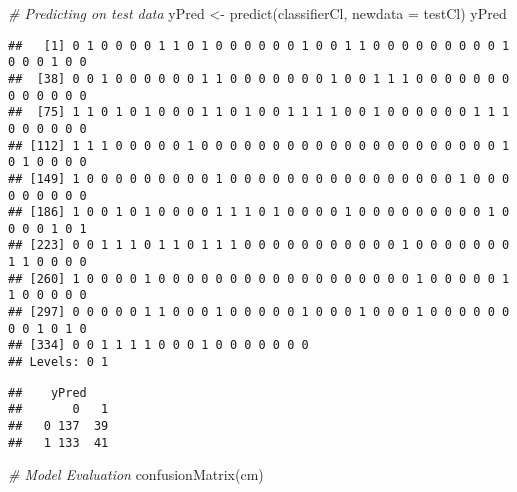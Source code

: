 \documentclass[
]{article}
\newenvironment{Shaded}{\begin{snugshade}}{\end{snugshade}}
\newcommand{\AttributeTok}[1]{\textcolor[rgb]{0.77,0.63,0.00}{#1}}
\newcommand{\CommentTok}[1]{\textcolor[rgb]{0.56,0.35,0.01}{\textit{#1}}}
\newcommand{\FunctionTok}[1]{\textcolor[rgb]{0.00,0.00,0.00}{#1}}
\newcommand{\NormalTok}[1]{#1}
\newcommand{\OtherTok}[1]{\textcolor[rgb]{0.56,0.35,0.01}{#1}}
\newcommand{\SpecialCharTok}[1]{\textcolor[rgb]{0.00,0.00,0.00}{#1}}
\begin{document}
\begin{Shaded}
\begin{Highlighting}[]
\CommentTok{\# Predicting on test data\textquotesingle{}}
\NormalTok{yPred }\OtherTok{\textless{}{-}} \FunctionTok{predict}\NormalTok{(classifierCl, }\AttributeTok{newdata =}\NormalTok{ testCl)}
\NormalTok{yPred}
\end{Highlighting}
\end{Shaded}

\begin{verbatim}
##   [1] 0 1 0 0 0 0 1 1 0 1 0 0 0 0 0 0 1 0 0 1 1 0 0 0 0 0 0 0 0 0 1 0 0 0 1 0 0
##  [38] 0 0 1 0 0 0 0 0 0 1 1 0 0 0 0 0 0 0 1 0 0 1 1 1 0 0 0 0 0 0 0 0 0 0 0 0 0
##  [75] 1 1 0 1 0 1 0 0 0 1 1 0 1 0 0 1 1 1 1 0 0 1 0 0 0 0 0 0 1 1 1 0 0 0 0 0 0
## [112] 1 1 1 0 0 0 0 0 1 0 0 0 0 0 0 0 0 0 0 0 0 0 0 0 0 0 0 0 0 0 1 0 1 0 0 0 0
## [149] 1 0 0 0 0 0 0 0 0 0 1 0 0 0 0 0 0 0 0 0 0 0 0 0 0 0 0 1 0 0 0 0 0 0 0 0 0
## [186] 1 0 0 1 0 1 0 0 0 0 1 1 1 0 1 0 0 0 0 1 0 0 0 0 0 0 0 0 0 1 0 0 0 0 1 0 1
## [223] 0 0 1 1 1 0 1 1 0 1 1 1 0 0 0 0 0 0 0 0 0 0 0 1 0 0 0 0 0 0 0 1 1 0 0 0 0
## [260] 1 0 0 0 0 1 0 0 0 0 0 0 0 0 0 0 0 0 0 0 0 0 0 0 1 0 0 0 0 0 1 1 0 0 0 0 0
## [297] 0 0 0 0 0 1 1 0 0 0 1 0 0 0 0 0 1 0 0 0 1 0 0 0 1 0 0 0 0 0 0 0 0 1 0 1 0
## [334] 0 0 1 1 1 1 0 0 0 1 0 0 0 0 0 0 0
## Levels: 0 1
\end{verbatim}

\begin{Shaded}
\end{Shaded}

\begin{verbatim}
##    yPred
##       0   1
##   0 137  39
##   1 133  41
\end{verbatim}

\begin{Shaded}
\begin{Highlighting}[]
\CommentTok{\# Model Evaluation}
\FunctionTok{confusionMatrix}\NormalTok{(cm)}
\end{Highlighting}
\end{Shaded}
\end{document}
